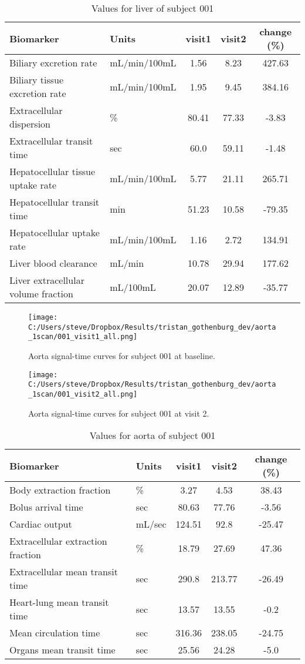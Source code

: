 \documentclass{epflreport}%
\begin{document}
\begin{table}[h!]%
\centering%
\begin{tabular}{llccc}%
\hline%
Biomarker&Units&visit1&visit2&change (\%)\\%
\hline%
Biliary excretion rate&mL/min/100mL&1.56&8.23&427.63\\%
Biliary tissue excretion rate&mL/min/100mL&1.95&9.45&384.16\\%
Extracellular dispersion&\%&80.41&77.33&{-}3.83\\%
Extracellular transit time&sec&60.0&59.11&{-}1.48\\%
Hepatocellular tissue uptake rate&mL/min/100mL&5.77&21.11&265.71\\%
Hepatocellular transit time&min&51.23&10.58&{-}79.35\\%
Hepatocellular uptake rate&mL/min/100mL&1.16&2.72&134.91\\%
Liver blood clearance&mL/min&10.78&29.94&177.62\\%
Liver extracellular volume fraction&mL/100mL&20.07&12.89&{-}35.77\\%
\hline%
\end{tabular}%
\caption{Values for liver of subject 001}%
\end{table}

%
\clearpage%


\begin{figure}[h!]%
\centering%
\texttt{[image: C:/Users/steve/Dropbox/Results/tristan\_gothenburg\_dev/aorta\_1scan/001\_visit1\_all.png]}%
\caption{Aorta signal{-}time curves for subject 001 at baseline.}%
\end{figure}

%


\begin{figure}[h!]%
\centering%
\texttt{[image: C:/Users/steve/Dropbox/Results/tristan\_gothenburg\_dev/aorta\_1scan/001\_visit2\_all.png]}%
\caption{Aorta signal{-}time curves for subject 001 at visit 2.}%
\end{figure}

%


\begin{table}[h!]%
\centering%
\begin{tabular}{llccc}%
\hline%
Biomarker&Units&visit1&visit2&change (\%)\\%
\hline%
Body extraction fraction&\%&3.27&4.53&38.43\\%
Bolus arrival time&sec&80.63&77.76&{-}3.56\\%
Cardiac output&mL/sec&124.51&92.8&{-}25.47\\%
Extracellular extraction fraction&\%&18.79&27.69&47.36\\%
Extracellular mean transit time&sec&290.8&213.77&{-}26.49\\%
Heart{-}lung mean transit time&sec&13.57&13.55&{-}0.2\\%
Mean circulation time&sec&316.36&238.05&{-}24.75\\%
Organs mean transit time&sec&25.56&24.28&{-}5.0\\%
\hline%
\end{tabular}%
\caption{Values for aorta of subject 001}%
\end{table}
\end{document}
